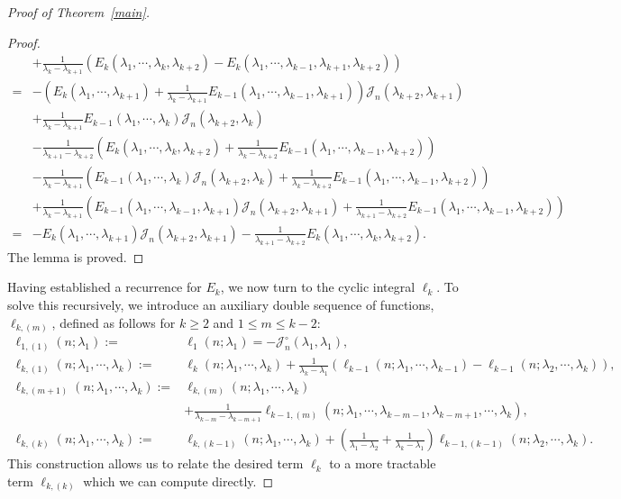 \documentclass[a4paper]{article}
\theoremstyle{plain}
\theoremstyle{definition}
\newcommand{\nn}{\nonumber}
\begin{document}
\begin{proof}[Proof of Theorem~\ref{main}]
\begin{proof}
\begin{align}
		&+\frac{1}{\lambda_k-\lambda_{k+1}}(E_k(\lambda_1,\cdots,\lambda_k,\lambda_{k+2})-E_k(\lambda_1,\cdots,\lambda_{k-1},\lambda_{k+1},\lambda_{k+2}))\nn\\
		=&-\left(E_k(\lambda_1,\cdots,\lambda_{k+1})+\frac{1}{\lambda_k-\lambda_{k+1}}E_{k-1}(\lambda_1,\cdots,\lambda_{k-1},\lambda_{k+1})\right)\mathcal J_n(\lambda_{k+2},\lambda_{k+1})\nn\\
		&+\frac{1}{\lambda_k-\lambda_{k+1}}E_{k-1}(\lambda_1,\cdots,\lambda_k)\mathcal J_n(\lambda_{k+2},\lambda_k)\nn\\
		&-\frac{1}{\lambda_{k+1}-\lambda_{k+2}}\left(E_k(\lambda_1,\cdots,\lambda_k,\lambda_{k+2})+\frac{1}{\lambda_k-\lambda_{k+2}}E_{k-1}(\lambda_1,\cdots,\lambda_{k-1},\lambda_{k+2})\right)\nn\\
		&-\frac{1}{\lambda_k-\lambda_{k+1}}\left(E_{k-1}(\lambda_1,\cdots,\lambda_k)\mathcal J_n(\lambda_{k+2},\lambda_k)+\frac{1}{\lambda_k-\lambda_{k+2}}E_{k-1}(\lambda_1,\cdots,\lambda_{k-1},\lambda_{k+2})\right)\nn\\
		&+\frac{1}{\lambda_k-\lambda_{k+1}}\left(E_{k-1}(\lambda_1,\cdots,\lambda_{k-1},\lambda_{k+1})\mathcal J_n(\lambda_{k+2},\lambda_{k+1})+\frac{1}{\lambda_{k+1}-\lambda_{k+2}}E_{k-1}(\lambda_1,\cdots,\lambda_{k-1},\lambda_{k+2})\right)\nn\\
		=&-E_k(\lambda_1,\cdots,\lambda_{k+1})\mathcal J_n(\lambda_{k+2},\lambda_{k+1})-\frac{1}{\lambda_{k+1}-\lambda_{k+2}}E_k(\lambda_1,\cdots,\lambda_k,\lambda_{k+2}).
	\end{align}
	The lemma is proved.
\end{proof}

Having established a recurrence for $E_k$, we now turn to the cyclic integral $\ell_k$. To solve this recursively, we introduce an auxiliary double sequence of functions, $\ell_{k,(m)}$, defined as follows for $k\ge2$ and $1\le m\le k-2$:
\begin{align}
	\ell_{1,(1)}(n;\lambda_1):=&\ell_1(n;\lambda_1)=-\mathcal J_n^\circ(\lambda_1,\lambda_1),\\
	\ell_{k,(1)}(n;\lambda_1,\cdots,\lambda_k):=&\ell_k(n;\lambda_1,\cdots,\lambda_k)+\frac{1}{\lambda_k-\lambda_1}(\ell_{k-1}(n;\lambda_1,\cdots,\lambda_{k-1})-\ell_{k-1}(n;\lambda_2,\cdots,\lambda_k)),\\
	\ell_{k,(m+1)}(n;\lambda_1,\cdots,\lambda_k):=&\ell_{k,(m)}(n;\lambda_1,\cdots,\lambda_k)\nn\\
	&+\frac{1}{\lambda_{k-m}-\lambda_{k-m+1}}\ell_{k-1,(m)}(n;\lambda_1,\cdots,\lambda_{k-m-1},\lambda_{k-m+1},\cdots,\lambda_k),\\
	\ell_{k,(k)}(n;\lambda_1,\cdots,\lambda_k):=&\ell_{k,(k-1)}(n;\lambda_1,\cdots,\lambda_k)+\left(\frac{1}{\lambda_1-\lambda_2}+\frac{1}{\lambda_k-\lambda_1}\right)\ell_{k-1,(k-1)}(n;\lambda_2,\cdots,\lambda_k).
\end{align}
This construction allows us to relate the desired term $\ell_k$ to a more tractable term $\ell_{k,(k)}$ which we can compute directly.


\end{proof}
\end{document}
